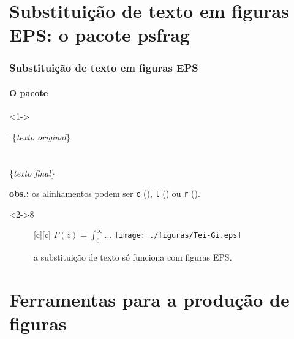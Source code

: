 \documentclass[handout,10pt]{beamer}
\begin{document}
\section{Substituição de texto em figuras EPS: o pacote psfrag}
\begin{frame}[fragile]
	\frametitle{Substituição de texto em figuras EPS}
	\framesubtitle{O pacote }
	
	\begin{block}<1->{}
		\begin{tabbing}
		\=\kill
		\>\{\textit{texto original}\}\\
		  \\
		  \\
		  \>\{\textit{texto final}\}
		\end{tabbing}
		  
		\footnotesize\textbf{obs.:} os alinhamentos podem ser \texttt{c} (), \texttt{l} () ou \texttt{r} ().
	\end{block}
	
	\begin{atividade}<2->{8}
		\begin{LaTeXcode}
			\begin{figure}
			  \centering
			  [c][c]
			    {$\displaystyle\Gamma(z) = \int_0^\infty ...$}
			  \texttt{[image: ./figuras/Tei-Gi.eps]}
			  \caption{a substituição de texto só funciona com figuras EPS.}
			\end{figure}
		\end{LaTeXcode}
	\end{atividade}
	
\end{frame}
\section{Ferramentas para a produção de figuras}
\end{document}
